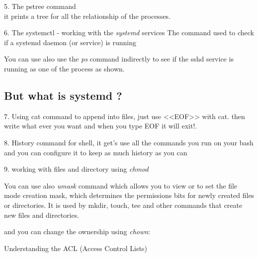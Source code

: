 \documentclass{article}
\begin{document}
5. The pstree command\\
it prints a tree for all the relationship of the processes.


6. The systemctl - working with the \textit{systemd} services
The command used to check if a systemd daemon (or service) is running




You can use also use the \textit{ps} command indirectly to see if the sshd service is running as one of the process as shown.

\subsection{But what is systemd ?}

7. Using cat command to append into files, just use <<EOF>> with cat. then write what ever you want and when you type EOF it will exit!.


8. History command for shell, it get's use all the commands you run on your bash and you can configure it to keep as much history as you can


9. working with files and directory using \textit{chmod}


You can use also \textit{umask} command which allows you to view or to set the file mode creation mask, which determines the permissions bits for newly created files or directories.
It is used by mkdir, touch, tee and other commands that create new files and directories.


and you can change the ownership using \textit{chown}:


Understanding the ACL (Access Control Lists)

\end{document}
